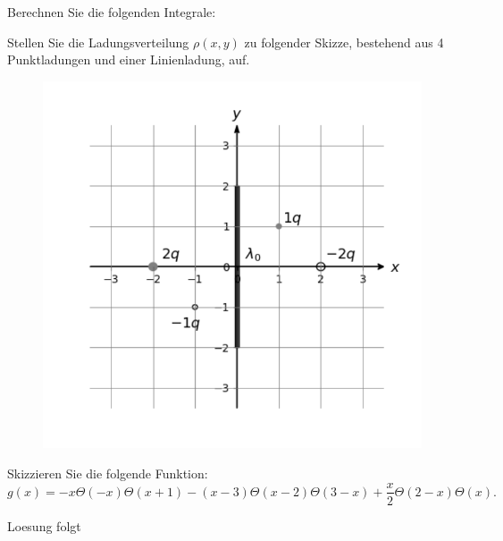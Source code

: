 \documentclass{atistandalonetask}
\begin{document}
  \begin{atiTask}[
    title = Delta- und Heaviside-Distributionen
  ]
  
 \begin{atiSubtasks}
 \item Berechnen Sie die folgenden Integrale:
 	\begin{atiSubequations}
 	\item{}
 	\item{}
 	\item{}
 	\item{}
 	\end{atiSubequations}
 \item Stellen Sie die Ladungsverteilung $\rho(x,y)$ zu folgender Skizze, bestehend aus 4 Punktladungen und einer Linienladung, auf. 
\begin{figure}[H]
\centering
\includegraphics[width=0.6\linewidth]{picture-delta_vii.pdf}
\end{figure}
 
 \item Skizzieren Sie die folgende Funktion:
 \[
 g(x)=-x\Theta(-x)\Theta(x+1)-(x-3)\Theta(x-2)\Theta(3-x)+\frac{x}{2}\Theta(2-x)\Theta(x).
 \]
 \end{atiSubtasks}

  \end{atiTask}
  \begin{atiSolution}
Loesung folgt
  \end{atiSolution}
\end{document}
